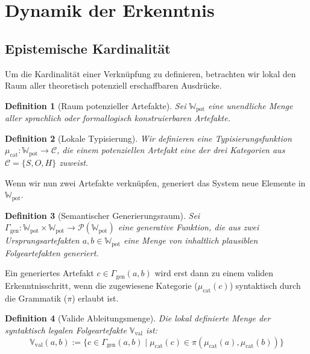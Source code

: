 \documentclass[11pt, a4paper]{article}
\newtheorem{definition}{Definition}
\begin{document}
	\section{Dynamik der Erkenntnis}
	
	\subsection{Epistemische Kardinalität}
	Um die Kardinalität einer Verknüpfung zu definieren, betrachten wir lokal den Raum aller theoretisch potenziell erschaffbaren Ausdrücke.
	
	\begin{definition}[Raum potenzieller Artefakte]
		Sei $\mathbb{W}_{\text{pot}}$ eine unendliche Menge aller sprachlich oder formallogisch konstruierbaren Artefakte.
	\end{definition}
	
	\begin{definition}[Lokale Typisierung]
		Wir definieren eine Typisierungsfunktion $\mu_{\text{cat}}: \mathbb{W}_{\text{pot}} \to \mathcal{C}$, die einem potenziellen Artefakt eine der drei Kategorien aus $\mathcal{C} = \{S, O, H\}$ zuweist.
	\end{definition}
	
	Wenn wir nun zwei Artefakte verknüpfen, generiert das System neue Elemente in $\mathbb{W}_{\text{pot}}$.
	
	\begin{definition}[Semantischer Generierungsraum]
		Sei $\Gamma_{\text{gen}}: \mathbb{W}_{\text{pot}} \times \mathbb{W}_{\text{pot}} \to \mathcal{P}(\mathbb{W}_{\text{pot}})$ eine generative Funktion, die aus zwei Ursprungsartefakten $a, b \in \mathbb{W}_{\text{pot}}$ eine Menge von inhaltlich plausiblen Folgeartefakten generiert.
	\end{definition}
	
	Ein generiertes Artefakt $c \in \Gamma_{\text{gen}}(a,b)$ wird erst dann zu einem validen Erkenntnisschritt, wenn die zugewiesene Kategorie ($\mu_{\text{cat}}(c)$) syntaktisch durch die Grammatik ($\pi$) erlaubt ist.
	
	\begin{definition}[Valide Ableitungsmenge]
		Die lokal definierte Menge der syntaktisch legalen Folgeartefakte $\mathbb{V}_{\text{val}}$ ist:
		\[
		\mathbb{V}_{\text{val}}(a, b) := \{ c \in \Gamma_{\text{gen}}(a, b) \mid \mu_{\text{cat}}(c) \in \pi(\mu_{\text{cat}}(a), \mu_{\text{cat}}(b)) \}
		\]
	\end{definition}
	
\end{document}
